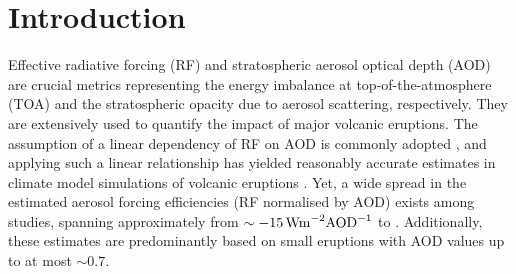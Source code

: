 \documentclass[draft]{agujournal2019}
\begin{document}
  \section{Introduction}


  Effective radiative forcing (RF) and stratospheric aerosol optical depth (AOD) are
  crucial metrics representing the energy imbalance at top-of-the-atmosphere (TOA) and
  the stratospheric opacity due to aerosol scattering, respectively. They are
  extensively used to quantify the impact of major volcanic eruptions. The assumption of
  a linear dependency of RF on AOD is commonly adopted \cite{myhre2013,andersson2015},
  and applying such a linear relationship has yielded reasonably accurate estimates in
  climate model simulations of volcanic eruptions
  \cite{mills2017,hansen2005,gregory2016,marshall2020,pitari2016b}. Yet, a wide spread
  in the estimated aerosol forcing efficiencies (RF normalised by AOD) exists among
  studies, spanning approximately from \(\sim \SI{-15}{\watt\metre^{-2}\ce{AOD}^{-1}}\)
  \cite{pitari2016b} to 
  \cite{myhre2013}. Additionally, these estimates are predominantly based on small
  eruptions with AOD values up to at most \(\sim 0.7\).
\end{document}
